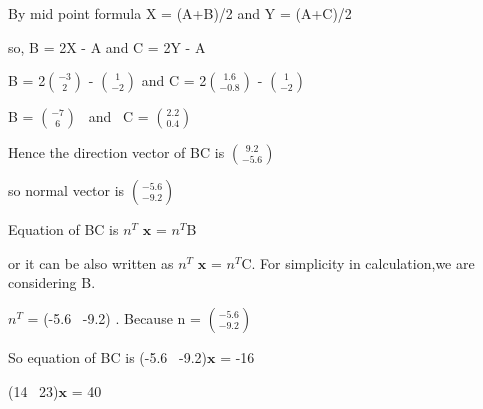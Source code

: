 \documentclass{beamer}
\begin{document}
\begin{frame}

\vspace{2 mm}
By mid point formula  X = (A+B)/2 and Y = (A+C)/2


\vspace{2 mm}
so, B = 2X - A and C = 2Y - A


\vspace{2 mm}
B = 2$\binom{-3}{2}$ - $\binom{1}{-2}$ and C = 2$\binom{1.6}{-0.8}$ - $\binom{1}{-2}$
  \setlength{\parindent}{1.2cm}
  
  
\vspace{2 mm}
B = $\binom{-7}{6}$ \ and \ C = $\binom{2.2}{0.4}$
  \setlength{\parindent}{0cm}
\vspace{2 mm}


Hence the direction vector of BC is $\binom{9.2}{-5.6}$\


\vspace{2 mm}
so normal vector is $\binom{-5.6}{-9.2}$\


\vspace{2 mm}
Equation of BC is $n^T$ $\boldsymbol{x}$ = $n^T$B 



\vspace{2 mm}
or it can be also written as  $n^T$ $\boldsymbol{x}$ = $n^T$C.
For simplicity in calculation,we are considering B.


\vspace{2 mm}
  \setlength{\parindent}{3.6cm}
$n^T$ = (-5.6  \ -9.2)  .
Because  n = $\binom{-5.6}{-9.2}$\

  \setlength{\parindent}{0cm}
\vspace{2 mm}
So equation of BC is (-5.6  \ -9.2)$\boldsymbol{x}$ = -16
  \setlength{\parindent}{3.6cm}
\vspace{2 mm}


(14  \ 23)$\boldsymbol{x}$ = 40
\end{frame}
\end{document}

